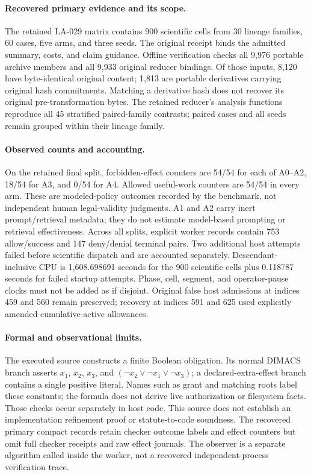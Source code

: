 \paragraph{Recovered primary evidence and its scope.}
The retained LA-029 matrix contains 900 scientific cells from 30 lineage
families, 60 cases, five arms, and three seeds. The original receipt binds
the admitted summary, costs, and claim guidance. Offline verification checks
all 9,976 portable archive members and all 9,933 original reducer bindings.
Of those inputs, 8,120 have byte-identical original content; 1,813 are portable
derivatives carrying original hash commitments. Matching a derivative hash
does not recover its original pre-transformation bytes. The retained reducer's
analysis functions reproduce all 45 stratified paired-family contrasts;
paired cases and all seeds remain grouped within their lineage family.

\paragraph{Observed counts and accounting.}
On the retained final split, forbidden-effect counters are 54/54 for each
of A0--A2, 18/54 for A3, and 0/54 for A4. Allowed useful-work counters are
54/54 in every arm. These are modeled-policy outcomes recorded by the
benchmark, not independent human legal-validity judgments. A1 and A2 carry
inert prompt/retrieval metadata; they do not estimate model-based prompting
or retrieval effectiveness. Across all splits, explicit worker records
contain 753 allow/success and 147 deny/denial terminal pairs. Two additional
host attempts failed before scientific dispatch and are accounted separately.
Descendant-inclusive CPU is 1,608.698691 seconds for the 900 scientific cells
plus 0.118787 seconds for failed startup attempts. Phase, cell, segment, and
operator-pause clocks must not be added as if disjoint. Original false host
admissions at indices 459 and 560 remain preserved; recovery at indices 591
and 625 used explicitly amended cumulative-active allowances.

\paragraph{Formal and observational limits.}
The executed source constructs a finite Boolean obligation. Its normal
DIMACS branch asserts $x_1$, $x_2$, $x_3$, and
$(\neg x_2\lor\neg x_1\lor\neg x_3)$; a declared-extra-effect branch
contains a single positive literal. Names such as grant and matching roots
label these constants; the formula does not derive live authorization or
filesystem facts. Those checks occur separately in host code. This source
does not establish an implementation refinement proof or statute-to-code
soundness. The recovered primary compact records retain checker outcome
labels and effect counters but omit full checker receipts and raw effect
journals. The observer is a separate algorithm called inside the worker,
not a recovered independent-process verification trace.

